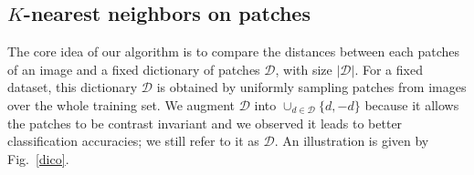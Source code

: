 \documentclass{article}
\begin{document}
{\subsection{$K$-nearest neighbors on patches}

The core idea of our algorithm is to compare the distances between each patches of an image and a fixed dictionary of patches $\mathcal{D}$, with size $|\mathcal{D}|$.
For a fixed dataset, this dictionary $\mathcal{D}$ is obtained by uniformly sampling patches from images over the whole training set. We augment $\mathcal{D}$ into $\cup_{d\in \mathcal{D}}\{d,-d\}$ because it allows the patches to be contrast invariant and we observed it leads to better classification accuracies; we still refer to it as $\mathcal{D}$. An illustration is given by Fig.~\ref{dico}.


\begin{figure}[h]
\centering
{}
\qquad
{}
\end{figure}}
\end{document}
